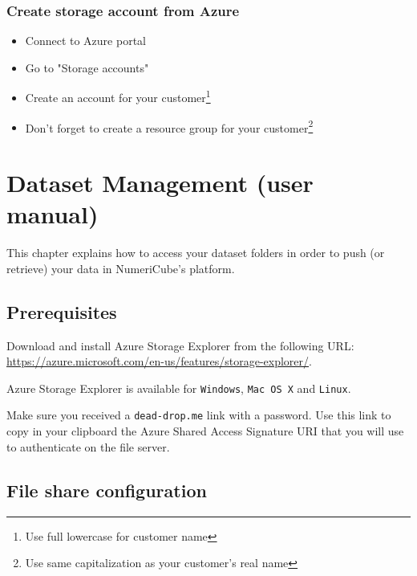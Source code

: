 \subsection{Create storage account from Azure}

\begin{itemize}
    \item Connect to Azure portal
    \item Go to "Storage accounts"
    \item Create an account for your customer\footnote{Use full lowercase for customer name}
    \item Don't forget to create a resource group for your customer\footnote{Use same capitalization as your customer's real name}
\end{itemize}


\chapter{Dataset Management (user manual)}
\label{chapter:customer-dataset-management}

This chapter explains how to access your dataset folders in order to push (or retrieve) your data in NumeriCube's platform.

\section{Prerequisites}

Download and install Azure Storage Explorer from the following URL: \url{https://azure.microsoft.com/en-us/features/storage-explorer/}.

Azure Storage Explorer is available for \texttt{Windows}, \texttt{Mac OS X} and \texttt{Linux}.

Make sure you received a \texttt{dead-drop.me} link with a password. Use this link to copy in your clipboard the Azure Shared Access Signature URI that you will use to authenticate on the file server.

\section{File share configuration}

